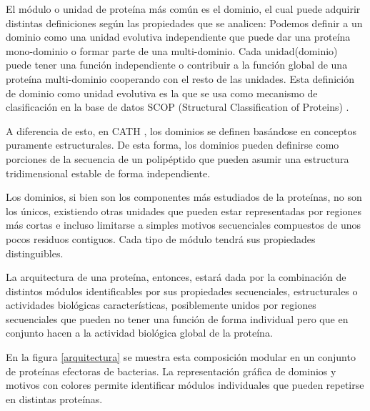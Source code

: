 El módulo o unidad de proteína más común es el dominio, el cual puede adquirir distintas definiciones según las propiedades que se analicen:
Podemos definir a un dominio como una unidad evolutiva independiente que puede dar una proteína mono-dominio o formar parte de una multi-dominio. 
Cada unidad(dominio) puede tener una función independiente o contribuir a la función global de una proteína multi-dominio cooperando con el resto de las unidades.
Esta definición de dominio como unidad evolutiva es la que se usa como mecanismo de clasificación en la base de datos SCOP (Structural Classification of Proteins) \cite{murzin1995scop}. 

A diferencia de esto, en CATH \cite{orengo1997cath}, los dominios se definen basándose en conceptos puramente estructurales. 
De esta forma, los dominios pueden definirse como porciones de la secuencia de un polipéptido que pueden asumir una estructura tridimensional estable de forma independiente. 

Los dominios, si bien son los componentes más estudiados de la proteínas, no son los únicos, existiendo otras unidades que pueden estar representadas por 
regiones más cortas e incluso limitarse a simples motivos secuenciales compuestos de unos pocos residuos contiguos.
Cada tipo de módulo tendrá sus propiedades distinguibles.

La arquitectura de una proteína, entonces, estará dada por la combinación de distintos módulos identificables por sus propiedades secuenciales, estructurales o actividades biológicas características, 
posiblemente unidos por regiones secuenciales que pueden no tener una función de forma individual pero que en conjunto hacen a la actividad biológica global de la proteína.

En la figura \ref{arquitectura} se muestra esta composición modular en un conjunto de proteínas efectoras de bacterias.
La representación gráfica de dominios y motivos con colores permite identificar módulos individuales que pueden repetirse en distintas proteínas.

